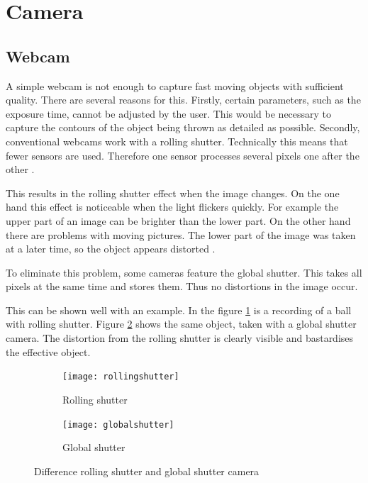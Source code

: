 \section{Camera}
\label{sec:camera}
\subsection{Webcam}
\label{subsec:webcam}
A simple webcam is not enough to capture fast moving objects with sufficient quality. 
There are several reasons for this.
Firstly, certain parameters, such as the exposure time, cannot be adjusted by the user.
This would be necessary to capture the contours of the object being thrown as detailed as possible.
Secondly, conventional webcams work with a rolling shutter.
Technically this means that fewer sensors are used. Therefore one sensor processes several pixels one after the other \cite{shuttermode}.

This results in the rolling shutter effect when the image changes.
On the one hand this effect is noticeable when the light flickers quickly.
For example the upper part of an image can be brighter than the lower part.
On the other hand there are problems with moving pictures.
The lower part of the image was taken at a later time, so the object appears distorted \cite{global_rolling_shutter}.

To eliminate this problem, some cameras feature the global shutter. 
This takes all pixels at the same time and stores them. 
Thus no distortions in the image occur.

This can be shown well with an example.
In the figure \ref{subfig:rollingshutter} is a recording of a ball with rolling shutter. 
Figure \ref{subfig:globalshutter} shows the same object, taken with a global shutter camera.
The distortion from the rolling shutter is clearly visible and bastardises the effective object.

\begin{figure}[ht]
	\centering
	\begin{subfigure}[b]{0.4\textwidth}
		\centering
		\texttt{[image: rollingshutter]}
		\caption{Rolling shutter}
		\label{subfig:rollingshutter}
	\end{subfigure}
	\begin{subfigure}[b]{0.4\textwidth}
		\centering
		\texttt{[image: globalshutter]}
		\caption{Global shutter}
		\label{subfig:globalshutter}
	\end{subfigure}
	\caption{Difference rolling shutter and global shutter camera \cite{shuttermode}}
	\label{fig:shuttermode}
\end{figure}

